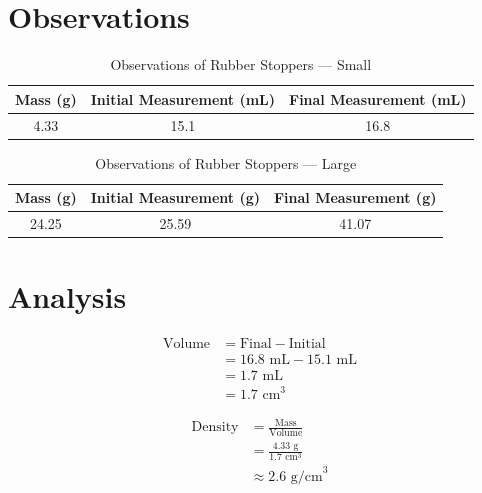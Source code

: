 \documentclass{article}
\begin{document}
\section{Observations}
\begin{table}[ht!]
    \centering
    \caption{Observations of Rubber Stoppers — Small}
    \label{tab:observations-small}
    \vspace{0.125 in}
    \begin{tabular}{|c|c|c|}
        \hline
        \textbf{Mass (g)} & \textbf{Initial Measurement (mL)} & \textbf{Final Measurement (mL)} \\
        \hline
        4.33 & 15.1 & 16.8 \\
        \hline
    \end{tabular}

\end{table}

\vspace{0.2in}

\begin{table}[ht!]
    \centering
    \caption{Observations of Rubber Stoppers — Large}
    \label{tab:observations-large}
    \vspace{0.125 in}
    \begin{tabular}{|c|c|c|}
        \hline
        \textbf{Mass (g)} & \textbf{Initial Measurement (g)} & \textbf{Final Measurement (g)} \\
        \hline
        24.25 & 25.59 & 41.07 \\
        \hline
    \end{tabular}

\end{table}

\section{Analysis}
\noindent
\begin{minipage}[t]{0.45\textwidth}
    \begin{align*}
        \text{Volume} &= \text{Final} - \text{Initial} \\
        &= 16.8 \text{ mL} - 15.1 \text{ mL} \\
        &= 1.7 \text{ mL} \\
        &= 1.7 \text{ cm}^3
    \end{align*}
\end{minipage}
\hfill
\begin{minipage}[t]{0.45\textwidth}
    \begin{align*}
        \text{Density} &= \frac{\text{Mass}}{\text{Volume}} \\
        &= \frac{4.33 \text{ g}}{1.7 \text{ cm}^3} \\
        &\approx 2.6 \text{ g/cm}^3
    \end{align*}
\end{minipage}\\
\end{document}
